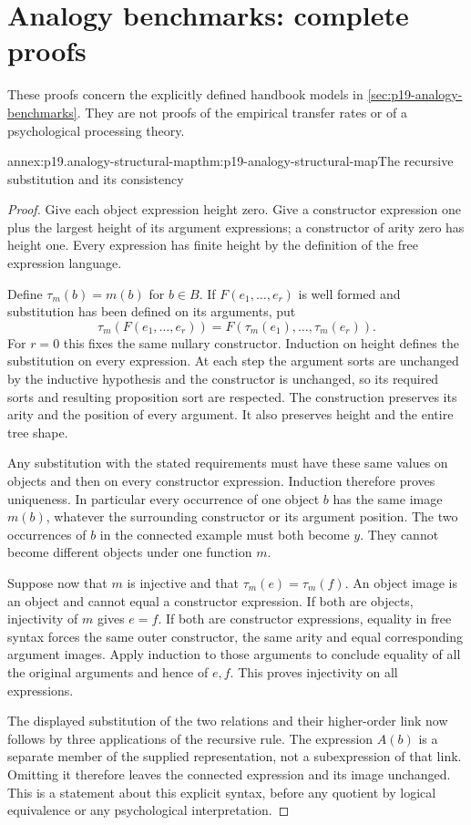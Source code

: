 \section{Analogy benchmarks: complete proofs}
\label{sec:annex-p19-analogy-and-problem-transfer}

These proofs concern the explicitly defined handbook models
in \cref{sec:p19-analogy-benchmarks}. They are not proofs
of the empirical transfer rates or of a psychological
processing theory.

\begin{annexitem}{annex:p19.analogy-structural-map}{thm:p19-analogy-structural-map}{The recursive substitution and its consistency}
\begin{proof}
Give each object expression height zero. Give a
constructor expression one plus the largest height
of its argument expressions; a constructor of arity
zero has height one. Every expression has finite
height by the definition of the free expression
language.

Define \(\tau_m(b)=m(b)\) for \(b\in B\).
If \(F(e_1,\ldots,e_r)\) is well formed and
substitution has been defined on its arguments,
put
\[
 \tau_m(F(e_1,\ldots,e_r))
          =F(\tau_m(e_1),\ldots,\tau_m(e_r)).
\]
For \(r=0\) this fixes the same nullary constructor.
Induction on height defines the substitution on
every expression. At each step the argument sorts
are unchanged by the inductive hypothesis and
the constructor is unchanged, so its required
sorts and resulting proposition sort are respected.
The construction preserves its arity and the
position of every argument. It also preserves
height and the entire tree shape.

Any substitution with the stated requirements
must have these same values on objects and
then on every constructor expression.
Induction therefore proves uniqueness.
In particular every occurrence of one object
\(b\) has the same image \(m(b)\), whatever
the surrounding constructor or its argument
position. The two occurrences of \(b\) in
the connected example must both become \(y\).
They cannot become different objects under
one function \(m\).

Suppose now that \(m\) is injective and that
\(\tau_m(e)=\tau_m(f)\).
An object image is an object and cannot equal
a constructor expression. If both are objects,
injectivity of \(m\) gives \(e=f\).
If both are constructor expressions, equality
in free syntax forces the same outer constructor,
the same arity and equal corresponding argument
images. Apply induction to those arguments
to conclude equality of all the original
arguments and hence of \(e,f\).
This proves injectivity on all expressions.

The displayed substitution of the two relations
and their higher-order link now follows by
three applications of the recursive rule.
The expression \(A(b)\) is a separate member
of the supplied representation, not a subexpression
of that link. Omitting it therefore leaves
the connected expression and its image unchanged.
This is a statement about this explicit syntax,
before any quotient by logical equivalence
or any psychological interpretation.
\end{proof}
\end{annexitem}

